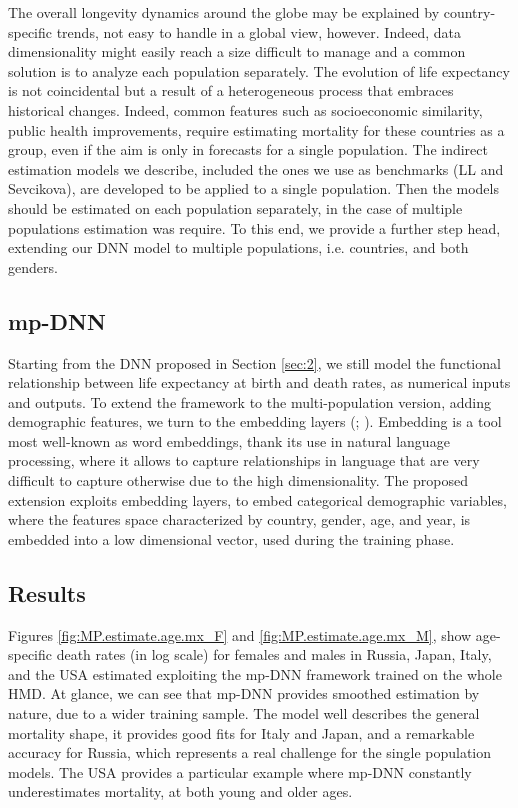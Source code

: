 \documentclass[a4,11pt]{article}
\begin{document}
The overall longevity dynamics around the globe may be explained by country-specific trends, not easy to handle in a global view, however. Indeed, data dimensionality might easily reach a size difficult to manage and a common solution is to analyze each population separately.
The evolution of life expectancy is not coincidental but a result of a heterogeneous process that embraces historical changes.
Indeed, common features such as socioeconomic similarity, public health improvements, require estimating mortality for these countries as a group, even if the aim is only in forecasts for a single population.
The indirect estimation models we describe, included the ones we use as benchmarks (LL and Sevcikova), are developed to be applied to a single population. Then the models should be estimated on each population separately, in the case of multiple populations estimation was require.
To this end, we provide a further step head, extending our DNN model to multiple populations, i.e. countries, and both genders.

\subsection{mp-DNN}
Starting from the DNN proposed in Section \ref{sec:2}, we still model the functional relationship between life expectancy at birth and death rates, as numerical inputs and outputs. To extend the framework to the multi-population version, adding demographic features, we turn to the embedding layers (\citet{richman}; \citet{embedding}).
Embedding is a tool most well-known as word embeddings, thank its use in natural language processing, where it allows to capture relationships in language that are very difficult to capture otherwise due to the high dimensionality. 
The proposed extension exploits embedding layers, to embed categorical demographic variables, where the features space characterized by country, gender, age, and year, is embedded into a low dimensional vector,  used during the training phase.

\subsection{Results}
Figures \ref{fig:MP.estimate.age.mx_F} and \ref{fig:MP.estimate.age.mx_M}, show age-specific death rates (in log scale) for females and males in Russia, Japan, Italy, and the USA estimated exploiting the mp-DNN framework trained on the whole HMD.
At glance, we can see that mp-DNN provides smoothed estimation by nature, due to a wider training sample. 
The model well describes the general mortality shape, it provides good fits for Italy and Japan, and a remarkable accuracy for  Russia, which represents a real challenge for the single population models.
The USA provides a particular example where mp-DNN constantly underestimates mortality, at both young and older ages.
\end{document}

